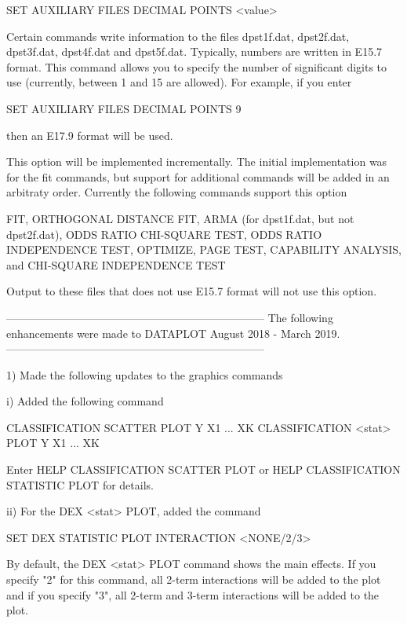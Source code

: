            SET AUXILIARY FILES DECIMAL POINTS <value>

         Certain commands write information to the files dpst1f.dat,
         dpst2f.dat, dpst3f.dat, dpst4f.dat and dpst5f.dat.  Typically,
         numbers are written in E15.7 format.  This command allows you to
         specify the number of significant digits to use (currently,
         between 1 and 15 are allowed).  For example, if you enter

           SET AUXILIARY FILES DECIMAL POINTS 9

         then an E17.9 format will be used.

         This option will be implemented incrementally.  The initial
         implementation was for the fit commands, but support for
         additional commands will be added in an arbitraty order.
         Currently the following commands support this option

           FIT, ORTHOGONAL DISTANCE FIT, ARMA (for dpst1f.dat, but not
           dpst2f.dat), ODDS RATIO CHI-SQUARE TEST, ODDS RATIO
           INDEPENDENCE TEST, OPTIMIZE, PAGE TEST, CAPABILITY ANALYSIS,
           and CHI-SQUARE INDEPENDENCE TEST

         Output to these files that does not use E15.7 format will not
         use this option.

-----------------------------------------------------------------------
The following enhancements were made to DATAPLOT
August 2018 - March 2019.
-----------------------------------------------------------------------

 1) Made the following updates to the graphics commands

      i) Added the following command

           CLASSIFICATION SCATTER PLOT Y X1 ... XK
           CLASSIFICATION <stat> PLOT  Y X1 ... XK

         Enter HELP CLASSIFICATION SCATTER PLOT or
         HELP CLASSIFICATION STATISTIC PLOT for details.

     ii) For the DEX <stat> PLOT, added the command

            SET DEX STATISTIC PLOT INTERACTION <NONE/2/3>

         By default, the DEX <stat> PLOT command shows the main effects.
         If you specify "2" for this command, all 2-term interactions
         will be added to the plot and if you specify "3", all 2-term
         and 3-term interactions will be added to the plot.

